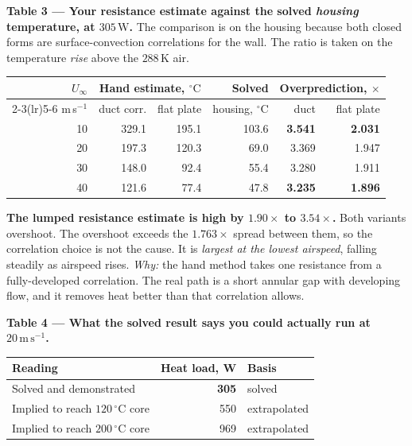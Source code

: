 \documentclass[9pt,a4paper]{article}
\renewcommand{\footnotesize}{\fontsize{6.9}{7.9}\selectfont}
\begin{document}
\begin{minipage}[t]{0.485\textwidth}
\textbf{Table 3 --- Your resistance estimate against the solved
\emph{housing} temperature, at $305\,\mathrm{W}$.} The comparison is on the
housing because both closed forms are surface-convection correlations for the
wall. The ratio is taken on the temperature \emph{rise} above the
$288\,\mathrm{K}$ air.

\vspace{2pt}
{\fontsize{7.2}{8.5}\selectfont
\begin{tabular}{r rr r rr}
\toprule
$U_{\infty}$ & \multicolumn{2}{c}{Hand estimate, $^{\circ}\mathrm{C}$} &
Solved & \multicolumn{2}{c}{Overprediction, $\times$} \\
\cmidrule(lr){2-3}\cmidrule(lr){5-6}
m\,s$^{-1}$ & duct corr. & flat plate & housing, $^{\circ}\mathrm{C}$ & duct & flat plate \\
\midrule
10 & 329.1 & 195.1 & 103.6 & \textbf{3.541} & \textbf{2.031} \\
20 & 197.3 & 120.3 & 69.0 & 3.369 & 1.947 \\
30 & 148.0 & 92.4 & 55.4 & 3.280 & 1.911 \\
40 & 121.6 & 77.4 & 47.8 & \textbf{3.235} & \textbf{1.896} \\
\bottomrule
\end{tabular}}

\vspace{2pt}
{\footnotesize\textbf{The lumped resistance estimate is high by
$1.90\times$ to $3.54\times$.} Both variants overshoot. The overshoot exceeds
the $1.763\times$ spread between them, so the correlation choice is not the
cause. It is \emph{largest at the lowest airspeed}, falling steadily as
airspeed rises. \emph{Why:} the hand method takes one resistance from a
fully-developed correlation. The real path is a short annular gap with
developing flow, and it removes heat better than that correlation allows.}

\vspace{2pt}
\textbf{Table 4 --- What the solved result says you could actually run at
$20\,\mathrm{m\,s^{-1}}$.}

\vspace{2pt}
{\fontsize{7.2}{8.5}\selectfont
\begin{tabular}{l r l}
\toprule
Reading & Heat load, W & Basis \\
\midrule
Solved and demonstrated        & \textbf{305} & solved \\
Implied to reach $120\,^{\circ}\mathrm{C}$ core & 550 & extrapolated \\
Implied to reach $200\,^{\circ}\mathrm{C}$ core & 969 & extrapolated \\
\bottomrule
\end{tabular}}


\end{minipage}
\end{document}
